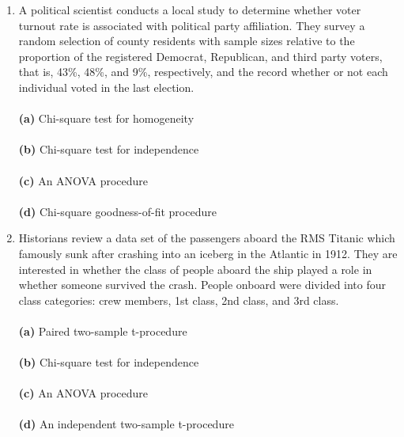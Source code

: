 \documentclass[12pt]{article}
\begin{document}
\begin{enumerate}[leftmargin=\labelsep]
\item A political scientist conducts a local study to determine whether voter turnout rate is associated with political party affiliation. They survey a random selection of county residents with sample sizes relative to the proportion of the registered Democrat, Republican, and third party voters, that is, 43\%, 48\%, and 9\%, respectively, and the record whether or not each individual voted in the last election.\\ \vspace{1mm}\\
{\bf (a)} \hspace{2mm} Chi-square test for homogeneity\\ \vspace{1mm}\\
{\bf (b)} \hspace{2mm} Chi-square test for independence\\   \vspace{1mm}\\
{\bf (c)} \hspace{2mm} An ANOVA procedure\\  \vspace{1mm}\\
{\bf (d)} \hspace{2mm} Chi-square goodness-of-fit procedure\\

\item  Historians review a data set of the passengers aboard the RMS Titanic which famously sunk after crashing into an iceberg in the Atlantic in 1912. They are interested in whether the class of people aboard the ship played a role in whether someone survived the crash. People onboard were divided into four class categories: crew members, 1st class, 2nd class, and 3rd class.\\ \vspace{1mm}\\
{\bf (a)} \hspace{2mm} Paired two-sample t-procedure\\ \vspace{1mm}\\
{\bf (b)} \hspace{2mm} Chi-square test for independence\\   \vspace{1mm}\\
{\bf (c)} \hspace{2mm} An ANOVA procedure\\  \vspace{1mm}\\
{\bf (d)} \hspace{2mm} An independent two-sample t-procedure\\


\end{enumerate}
\end{document}
